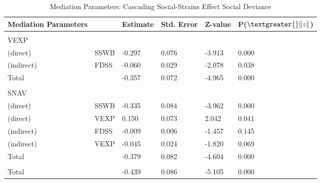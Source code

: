 \documentclass[utf8]{article}
\begin{document}
\begin{table}[]
\begin{tabular}{llllll}
Mediation Parameters &      & Estimate & Std. Error & Z-value & P($\textgreater{}\|z\|$) \\ \hline
                     &      &          &            &         &                          \\
VEXP                 &      &          &            &         &                          \\
(direct)             & SSWB & -0.297   & 0.076      & -3.913  & 0.000                    \\
(indirect)           & FDSS & -0.060   & 0.029      & -2.078  & 0.038                    \\
Total                &      & -0.357   & 0.072      & -4.965  & 0.000                    \\
                     &      &          &            &         &                          \\
SNAV                 &      &          &            &         &                          \\
(direct)             & SSWB & -0.335   & 0.084      & -3.962  & 0.000                    \\
(direct)             & VEXP & 0.150    & 0.073      & 2.042   & 0.041                    \\
(indirect)           & FDSS & -0.009   & 0.006      & -1.457  & 0.145                    \\
(indirect)           & VEXP & -0.045   & 0.024      & -1.820  & 0.069                    \\
Total                &      & -0.379   & 0.082      & -4.604  & 0.000                    \\
                     &      &          &            &         &                          \\
Total                &      & -0.439   & 0.086      & -5.105  & 0.000                   
\end{tabular}
\caption{Mediation Parameters: Cascading Social-Strains Effect Social Deviance\label{tab:14}}
\end{table}


\end{document}
